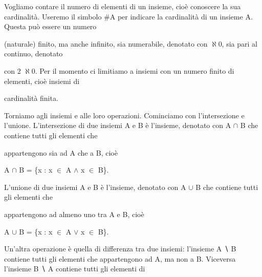 \documentclass[a4paper,portrait,12pt]{article}
\begin{document}
\begin{flushleft}
Vogliamo contare il numero di elementi di un insieme, cio\`{e} conoscere la sua cardinalit\`{a}. Useremo il simbolo \#A per indicare la cardinalit\`{a} di un insieme A. Questa pu\`{o} essere un numero
\end{flushleft}


\begin{flushleft}
(naturale) finito, ma anche infinito, sia numerabile, denotato con $\aleph$0, sia pari al continuo, denotato
\end{flushleft}


\begin{flushleft}
con 2 $\aleph$0. Per il momento ci limitiamo a insiemi con un numero finito di elementi, cio\`{e} insiemi di
\end{flushleft}


\begin{flushleft}
cardinalit\`{a} finita.
\end{flushleft}


\begin{flushleft}
Torniamo agli insiemi e alle loro operazioni. Cominciamo con l'intersezione e l'unione. L'intersezione di due insiemi A e B \`{e} l'insieme, denotato con A $\cap$ B che contiene tutti gli elementi che
\end{flushleft}


\begin{flushleft}
appartengono sia ad A che a B, cio\`{e}
\end{flushleft}


\begin{flushleft}
A $\cap$ B = \{x : x $\in$ A $\land$ x $\in$ B\}.
\end{flushleft}


\begin{flushleft}
L'unione di due insiemi A e B \`{e} l'insieme, denotato con A $\cup$ B che contiene tutti gli elementi che
\end{flushleft}


\begin{flushleft}
appartengono ad almeno uno tra A e B, cio\`{e}
\end{flushleft}


\begin{flushleft}
A $\cup$ B = \{x : x $\in$ A $\lor$ x $\in$ B\}.
\end{flushleft}


\begin{flushleft}
Un'altra operazione \`{e} quella di differenza tra due insiemi: l'insieme A ∖ B contiene tutti gli elementi che appartengono ad A, ma non a B. Viceversa l'insieme B ∖ A contiene tutti gli elementi di
\end{flushleft}
\end{document}
